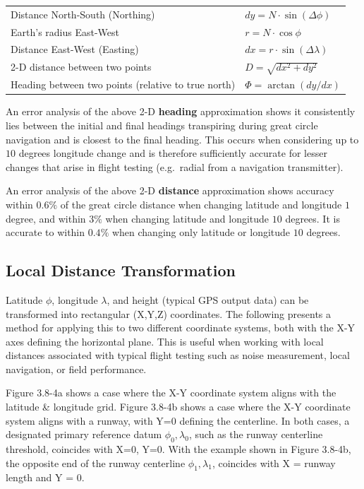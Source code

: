 \documentclass[
]{book}
\begin{document}
\begin{longtable}[]{@{}ll@{}}
\toprule
\endhead
Distance North-South (Northing) & \(dy = N \cdot \sin\left( \Delta\phi \right)\)\tabularnewline
Earth's radius East-West & \(r = N \cdot \cos{\phi}\)\tabularnewline
Distance East-West (Easting) & \(dx = r \cdot \sin\left(\Delta\lambda\right)\)\tabularnewline
2-D distance between two points & \(D = \sqrt{dx^2 + dy^2}\)\tabularnewline
Heading between two points (relative to true north) & \(\Phi = \arctan \left( dy/dx \right)\)\tabularnewline
\bottomrule
\end{longtable}

An error analysis of the above 2-D \textbf{heading} approximation shows it consistently lies between the initial and final headings transpiring during great circle navigation and is closest to the final heading.
This occurs when considering up to \(10\) degrees longitude change and is therefore sufficiently accurate for lesser changes that arise in flight testing (e.g.~radial from a navigation transmitter).

An error analysis of the above 2-D \textbf{distance} approximation shows accuracy within \(0.6\%\) of the great circle distance when changing latitude and longitude \(1\) degree, and within \(3\%\) when changing latitude and longitude \(10\) degrees.
It is accurate to within \(0.4\%\) when changing only latitude or longitude \(10\) degrees.

\hypertarget{local-distance-transformation}{%
\subsection*{Local Distance Transformation}\label{local-distance-transformation}}

Latitude \(\phi\), longitude \(\lambda\), and height (typical GPS output data) can be transformed into rectangular (X,Y,Z) coordinates. The following presents a method for applying this to two different coordinate systems, both with the X-Y axes defining the horizontal plane. This is useful when working with local distances associated with typical flight testing such as noise measurement, local navigation, or field performance.

Figure 3.8-4a shows a case where the X-Y coordinate system aligns with the latitude \& longitude grid. Figure 3.8-4b shows a case where the X-Y coordinate system aligns with a runway, with Y=0 defining the centerline. In both cases, a designated primary reference datum \(\phi_0, \lambda_0\), such as the runway centerline threshold, coincides with X=0, Y=0. With the example shown in Figure 3.8-4b, the opposite end of the runway centerline \(\phi_1, \lambda_1\), coincides with X = runway length and Y = 0.
\end{document}
